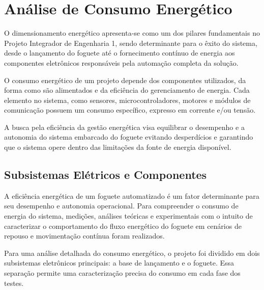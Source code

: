 


\section{Análise de Consumo Energético}

O dimensionamento energético apresenta-se como um dos pilares fundamentais no Projeto Integrador de Engenharia 1, sendo determinante para o êxito do sistema, desde o lançamento do foguete até o fornecimento contínuo de energia aos componentes eletrônicos responsáveis pela automação completa da solução. 

O consumo energético de um projeto depende dos componentes utilizados, da forma como são alimentados e da eficiência do gerenciamento de energia. Cada elemento no sistema, como sensores, microcontroladores, motores e módulos de comunicação possuem um consumo específico, expresso em corrente e/ou tensão. 

A busca pela eficiência da gestão energética visa equilibrar o desempenho e a autonomia do sistema embarcado do foguete evitando desperdícios e garantindo que o sistema opere dentro das limitações da fonte de energia disponível. 

\subsection{Subsistemas Elétricos e Componentes}

A eficiência energética de um foguete automatizado é um fator determinante para seu desempenho e autonomia operacional. Para compreender o consumo de energia do sistema, medições, análises teóricas e experimentais com o intuito de caracterizar o comportamento do fluxo energético do foguete em cenários de repouso e movimentação contínua foram realizados.  

Para uma análise detalhada do consumo energético, o projeto foi dividido em dois subsistemas eletrônicos principais: a base de lançamento e o foguete. Essa separação permite uma caracterização precisa do consumo em cada fase dos testes.

